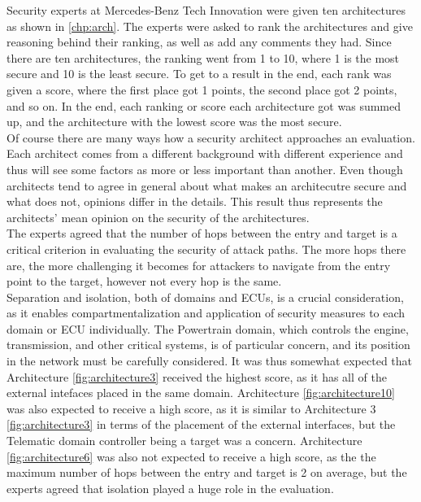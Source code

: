 Security experts at Mercedes-Benz Tech Innovation were given ten architectures as shown in \ref{chp:arch}.
The experts were asked to rank the architectures and give reasoning behind their ranking, as well as add any comments they had.
Since there are ten architectures, the ranking went from 1 to 10, where 1 is the most secure and 10 is the least secure.
To get to a result in the end, each rank was given a score, where the first place got 1 points, the second place got 2 points, and so on.
In the end, each ranking or score each architecture got was summed up, and the architecture with the lowest score was the most secure.\\

Of course there are many ways how a security architect approaches an evaluation.
Each architect comes from a different background with different experience and thus will see some factors as more or less important than another.
Even though architects tend to agree in general about what makes an architecutre secure and what does not, opinions differ in the details.
This result thus represents the architects' mean opinion on the security of the architectures.\\

The experts agreed that the number of hops between the entry and target is a critical criterion in evaluating the security of attack paths. 
The more hops there are, the more challenging it becomes for attackers to navigate from the entry point to the target, however not every hop is the same.\\

Separation and isolation, both of domains and ECUs, is a crucial consideration, as it enables compartmentalization and application of security measures to each domain or ECU individually. 
The Powertrain domain, which controls the engine, transmission, and other critical systems, is of particular concern, and its position in the network must be carefully considered. 
It was thus somewhat expected that Architecture \ref{fig:architecture3} received the highest score, as it has all of the external intefaces placed in the same domain.
Architecture \ref{fig:architecture10} was also expected to receive a high score, as it is similar to Architecture 3 \ref{fig:architecture3} in terms of the placement of the external interfaces,
but the Telematic domain controller being a target was a concern.
Architecture \ref{fig:architecture6} was also not expected to receive a high score, as the the maximum number of hops between the entry and target is 2 on average,
but the experts agreed that isolation played a huge role in the evaluation.\\

